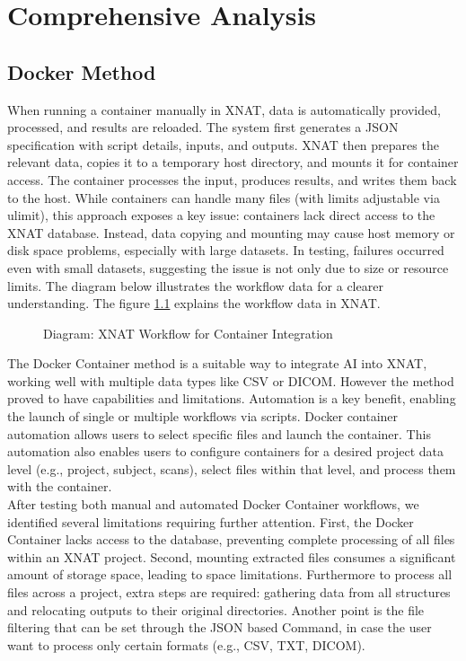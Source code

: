 \chapter{Comprehensive Analysis}
\section{Docker Method}

When running a container manually in XNAT, data is automatically provided, processed, and results are reloaded. The system first generates a JSON specification with script details, inputs, and outputs. XNAT then prepares the relevant data, copies it to a temporary host directory, and mounts it for container access. The container processes the input, produces results, and writes them back to the host.
While containers can handle many files (with limits adjustable via ulimit), this approach exposes a key issue: containers lack direct access to the XNAT database. Instead, data copying and mounting may cause host memory or disk space problems, especially with large datasets. In testing, failures occurred even with small datasets, suggesting the issue is not only due to size or resource limits.
The diagram below illustrates the workflow data for a clearer understanding.  
The figure \ref{fig:workflowxnat} explains the workflow data in XNAT.

\begin{figure}[H]
    \centering
    \def\svgwidth{\linewidth} 
    
    \caption{Diagram: XNAT Workflow for Container Integration}
    \label{fig:workflowxnat}
\end{figure}



The Docker Container method is a suitable way to integrate AI into XNAT, working well with multiple data types like CSV or DICOM. However the method proved to have capabilities and limitations.
Automation is a key benefit, enabling the launch of single or multiple workflows via scripts. Docker container automation allows users to select specific files and launch the container. This automation also enables users to configure containers for a desired project data level (e.g., project, subject, scans), select files within that level, and process them with the container. \\

After testing both manual and automated Docker Container workflows, we identified several limitations requiring further attention. First, the Docker Container lacks access to the database, preventing complete processing of all files within an XNAT project. Second, mounting extracted files consumes a significant amount of storage space, leading to space limitations.
Furthermore to process all files across a project, extra steps are required: gathering data from all structures and relocating outputs to their original directories.
Another point is the file filtering that can be set through the JSON based Command, in case the user want to process only certain formats (e.g., CSV, TXT, DICOM).

